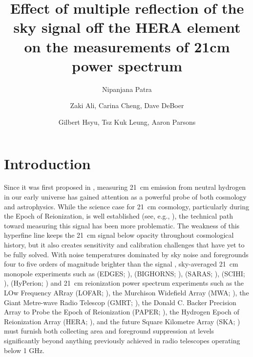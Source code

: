 \documentclass[12pt,preprint]{aastex}
\begin{document}
\title{Effect of multiple reflection of the sky signal off the HERA element on the measurements of 21cm power spectrum} 

\author{Nipanjana Patra }


\author{Zaki Ali, Carina Cheng, Dave DeBoer}
\author{Gilbert Hsyu, Tsz Kuk Leung, Aaron Parsons}


\begin{abstract}
\end{abstract}


\section{Introduction}

Since it was first proposed in \citet{shaver_et_al1999}, measuring 21~cm
emission from neutral hydrogen in our early universe has gained attention as a
powerful probe of both cosmology and astrophysics.  While the science case for
21~cm cosmology, particularly during the Epoch of Reionization, is well
established (see, e.g.,
\citealt{furlanetto_et_al2006,morales_wyithe2010,furlanetto_loeb2014,pritchard_loeb2014}),
the technical path toward measuring this signal has been more problematic.  The
weakness of this hyperfine line keeps the 21~cm signal below opacity throughout
cosmological history, but it also creates sensitivity and calibration
challenges that have yet to be fully solved.  With noise temperatures dominated
by sky noise \citep{XXX} and foregrounds four to five orders of magnitude
brighter than the signal \citep{XXX}, 
sky-averaged 21~cm monopole experiments such as
(EDGES; \citealt{XXX}),
(BIGHORNS; \citealt{XXX}),
(SARAS; \citealt{patra_et_al2014}),
(SCIHI; \citealt{voytek_et_al2014}),
(HyPerion; \citealt{presley_et_al2015})
and 21~cm reionization power spectrum experiments such as
the LOw Frequency ARray (LOFAR; \citealt{XXX}),
the Murchison Widefield Array (MWA; \citealt{XXX}),
the Giant Metre-wave Radio Telescop (GMRT; \citealt{XXX}),
the Donald C. Backer Precision Array to Probe the Epoch of Reionization (PAPER; \citealt{parsons_et_al2010}),
the Hydrogen Epoch of Reionization Array (HERA; \citealt{XXX}),
and the future Square Kilometre Array (SKA; \citealt{XXX})
must
furnish both collecting area and foreground suppression at levels significantly
beyond anything previously achieved in radio telescopes operating below 1 GHz.
\end{document}
